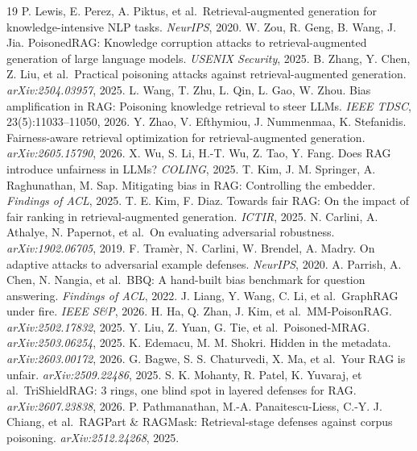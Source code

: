 \documentclass[review,3p,times]{elsarticle}
\begin{document}
\begin{thebibliography}{19}
 P. Lewis, E. Perez, A. Piktus, et al.~Retrieval-augmented generation for knowledge-intensive NLP tasks. \emph{NeurIPS}, 2020.
 W. Zou, R. Geng, B. Wang, J. Jia. PoisonedRAG: Knowledge corruption attacks to retrieval-augmented generation of large language models. \emph{USENIX Security}, 2025.
 B. Zhang, Y. Chen, Z. Liu, et al.~Practical poisoning attacks against retrieval-augmented generation. \emph{arXiv:2504.03957}, 2025.
 L. Wang, T. Zhu, L. Qin, L. Gao, W. Zhou. Bias amplification in RAG: Poisoning knowledge retrieval to steer LLMs. \emph{IEEE TDSC}, 23(5):11033--11050, 2026.
 Y. Zhao, V. Efthymiou, J. Nummenmaa, K. Stefanidis. Fairness-aware retrieval optimization for retrieval-augmented generation. \emph{arXiv:2605.15790}, 2026.
 X. Wu, S. Li, H.-T. Wu, Z. Tao, Y. Fang. Does RAG introduce unfairness in LLMs? \emph{COLING}, 2025.
 T. Kim, J. M. Springer, A. Raghunathan, M. Sap. Mitigating bias in RAG: Controlling the embedder. \emph{Findings of ACL}, 2025.
 T. E. Kim, F. Diaz. Towards fair RAG: On the impact of fair ranking in retrieval-augmented generation. \emph{ICTIR}, 2025.
 N. Carlini, A. Athalye, N. Papernot, et al.~On evaluating adversarial robustness. \emph{arXiv:1902.06705}, 2019.
 F. Tramèr, N. Carlini, W. Brendel, A. Madry. On adaptive attacks to adversarial example defenses. \emph{NeurIPS}, 2020.
 A. Parrish, A. Chen, N. Nangia, et al.~BBQ: A hand-built bias benchmark for question answering. \emph{Findings of ACL}, 2022.
 J. Liang, Y. Wang, C. Li, et al.~GraphRAG under fire. \emph{IEEE S\&P}, 2026.
 H. Ha, Q. Zhan, J. Kim, et al.~MM-PoisonRAG. \emph{arXiv:2502.17832}, 2025.
 Y. Liu, Z. Yuan, G. Tie, et al.~Poisoned-MRAG. \emph{arXiv:2503.06254}, 2025.
 K. Edemacu, M. M. Shokri. Hidden in the metadata. \emph{arXiv:2603.00172}, 2026.
 G. Bagwe, S. S. Chaturvedi, X. Ma, et al.~Your RAG is unfair. \emph{arXiv:2509.22486}, 2025.
 S. K. Mohanty, R. Patel, K. Yuvaraj, et al.~TriShieldRAG: 3 rings, one blind spot in layered defenses for RAG. \emph{arXiv:2607.23838}, 2026.
 P. Pathmanathan, M.-A. Panaitescu-Liess, C.-Y. J. Chiang, et al.~RAGPart \& RAGMask: Retrieval-stage defenses against corpus poisoning. \emph{arXiv:2512.24268}, 2025.

\end{thebibliography}
\end{document}
